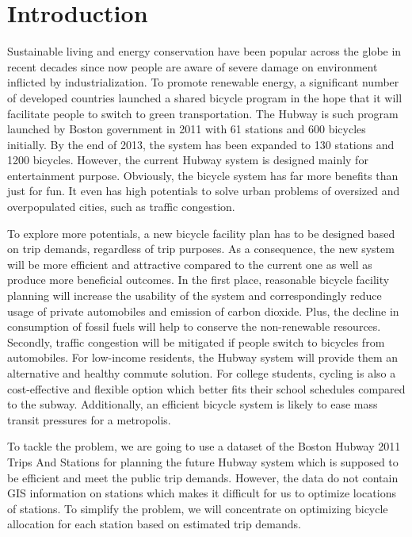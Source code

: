 \documentclass[journal, letterpaper]{IEEEtran}
\begin{document}
\section{Introduction}
\large
Sustainable living and energy conservation have been popular across the globe in recent decades since now people are aware of severe damage on environment inflicted by industrialization. To promote renewable energy, a significant number of developed countries launched a shared bicycle program in the hope that it will facilitate people to switch to green transportation. The Hubway is such program launched by Boston government in 2011 with 61 stations and 600 bicycles initially. By the end of 2013, the system has been expanded to 130 stations and 1200 bicycles. However, the current Hubway system is designed mainly for entertainment purpose. Obviously, the bicycle system has far more benefits than just for fun. It even has high potentials to solve urban problems of oversized and overpopulated cities, such as traffic congestion. 

To explore more potentials, a new bicycle facility plan has to be designed based on trip demands, regardless of trip purposes. As a consequence, the new system will be more efficient and attractive compared to the current one as well as produce more beneficial outcomes. In the first place, reasonable bicycle facility planning will increase the usability of the system and correspondingly reduce usage of private automobiles and emission of carbon dioxide. Plus, the decline in consumption of fossil fuels will help to conserve the non-renewable resources. Secondly, traffic congestion will be mitigated if people switch to bicycles from automobiles. For low-income residents, the Hubway system will provide them an alternative and healthy commute solution. For college students, cycling is also a cost-effective and flexible option which better fits their school schedules compared to the subway. Additionally, an efficient bicycle system is likely to ease mass transit pressures for a metropolis.   

To tackle the problem, we are going to use a dataset of the Boston Hubway 2011 Trips And Stations for planning the future Hubway system which is supposed to be efficient and meet the public trip demands. However, the data do not contain GIS information on stations which makes it difficult for us to optimize locations of stations. To simplify the problem, we will concentrate on optimizing bicycle allocation for each station based on estimated trip demands.  
\end{document}
